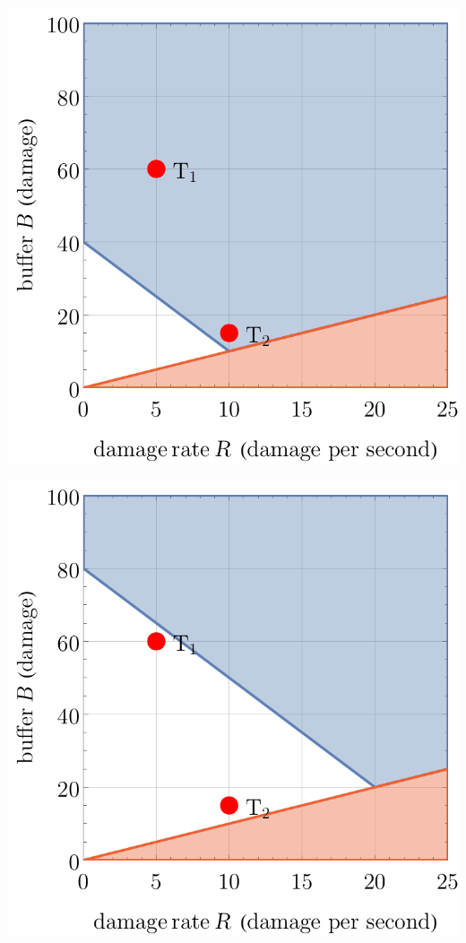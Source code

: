 \begin{center}
    \captionsetup{type=figure}
    \begin{minipage}{.33\textwidth}
        \centering
        \includegraphics[width=0.95\linewidth]{img/model3 base.pdf}
    \end{minipage}%
    \begin{minipage}{.33\textwidth}
        \centering
        \includegraphics[width=0.95\linewidth]{img/model3 h20.pdf}

\end{minipage}
\end{center}
